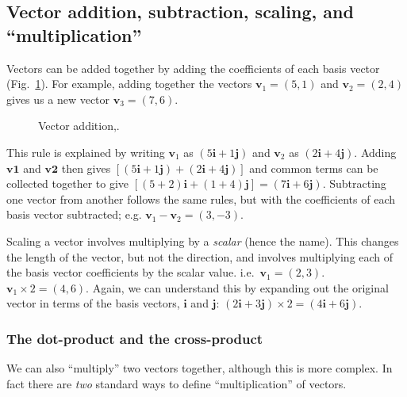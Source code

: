 \documentclass[a4paper]{article}
\newcommand{\bvec}[1]{\mathbf{#1}}
\begin{document}
\subsection{Vector addition, subtraction, scaling, and ``multiplication''}
Vectors can be added together by adding the coefficients of each basis vector (Fig.~\ref{fig:vector_addition}). For example, adding together the vectors $\bvec{v}_1=(5,1)$ and $\bvec{v}_2=(2,4)$ gives us a new vector $\bvec{v}_3=(7,6)$. \begin{figure}[htb]
  \centering
    \caption{\label{fig:vector_addition}Vector addition,.}
\end{figure}
This rule is explained by writing $\bvec{v}_1$ as $(5\bvec{i}+1\bvec{j})$ and $\bvec{v}_2$ as $(2\bvec{i}+4\bvec{j})$. Adding $\bvec{v1}$ and $\bvec{v2}$ then gives $\left[(5\bvec{i}+1\bvec{j})+(2\bvec{i}+4\bvec{j})\right]$ and common terms can be collected together to give $\left[(5+2)\bvec{i}+(1+4)\bvec{j}\right]=(7\bvec{i}+6\bvec{j})$. Subtracting one vector from another follows the same rules, but with the coefficients of each basis vector subtracted; e.g. $\bvec{v}_1-\bvec{v}_2=(3,-3)$. 

Scaling a vector involves multiplying by a \emph{scalar} (hence the name). This changes the length of the vector, but not the direction, and involves multiplying each of the basis vector coefficients by the scalar value. i.e.~$\bvec{v}_\mathrm{1}=(2,3)$. $\bvec{v}_1\times2=(4,6)$. Again, we can understand this by expanding out the original vector in terms of the basis vectors, $\bvec{i}$ and $\bvec{j}$: $(2\bvec{i}+3\bvec{j})\times2=(4\bvec{i}+6\bvec{j})$.

\subsubsection{The dot-product and the cross-product}
We can also ``multiply'' two vectors together, although this is more complex. In fact there are \emph{two} standard ways to define ``multiplication'' of vectors.
\end{document}
